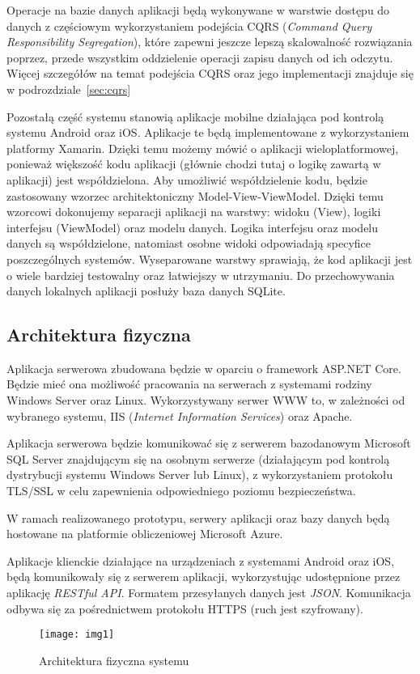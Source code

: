 \par Operacje na bazie danych aplikacji będą wykonywane w warstwie dostępu do danych z częściowym wykorzystaniem podejścia CQRS (\textit{Command Query Responsibility Segregation}), które zapewni jeszcze lepszą skalowalność rozwiązania poprzez, przede wszystkim oddzielenie operacji zapisu danych od ich odczytu. Więcej szczegółów na temat podejścia CQRS oraz jego implementacji znajduje się w podrozdziale~\ref{sec:cqrs}

\par Pozostałą część systemu stanowią aplikacje mobilne działająca pod kontrolą systemu Android oraz iOS. Aplikacje te będą implementowane z wykorzystaniem platformy Xamarin. Dzięki temu możemy mówić o aplikacji wieloplatformowej, ponieważ większość kodu aplikacji (głównie chodzi tutaj o logikę zawartą w aplikacji) jest współdzielona. Aby umożliwić współdzielenie kodu, będzie zastosowany wzorzec architektoniczny Model-View-ViewModel. Dzięki temu wzorcowi dokonujemy separacji aplikacji na warstwy: widoku (View), logiki interfejsu (ViewModel) oraz modelu danych. Logika interfejsu oraz modelu danych są współdzielone, natomiast osobne widoki odpowiadają specyfice poszczególnych systemów. Wyseparowane warstwy sprawiają, że kod aplikacji jest o wiele bardziej testowalny oraz łatwiejszy w utrzymaniu. Do przechowywania danych lokalnych aplikacji posłuży baza danych SQLite.

\subsection*{Architektura fizyczna}
Aplikacja serwerowa zbudowana będzie w oparciu o framework ASP.NET Core. Będzie mieć ona możliwość pracowania na serwerach z systemami rodziny Windows Server oraz Linux. Wykorzystywany serwer WWW to, w zależności od wybranego systemu, IIS (\textit{Internet Information Services}) oraz Apache.

\par Aplikacja serwerowa będzie komunikować się z serwerem bazodanowym Microsoft SQL Server znajdującym się na osobnym serwerze (działającym pod kontrolą dystrybucji systemu Windows Server lub Linux), z wykorzystaniem protokołu TLS/SSL w celu zapewnienia odpowiedniego poziomu bezpieczeństwa.

\par W ramach realizowanego prototypu, serwery aplikacji oraz bazy danych będą hostowane na platformie obliczeniowej Microsoft Azure. 

\par Aplikacje klienckie działające na urządzeniach z systemami Android oraz iOS, będą komunikowały się z serwerem aplikacji, wykorzystując udostępnione przez aplikację \textit{RESTful API}. Formatem przesyłanych danych jest \textit{JSON}. Komunikacja odbywa się za pośrednictwem protokołu HTTPS (ruch jest szyfrowany).
\begin{figure}[h]
\centering
\texttt{[image: img1]}
\caption{Architektura fizyczna systemu}
\end{figure}
